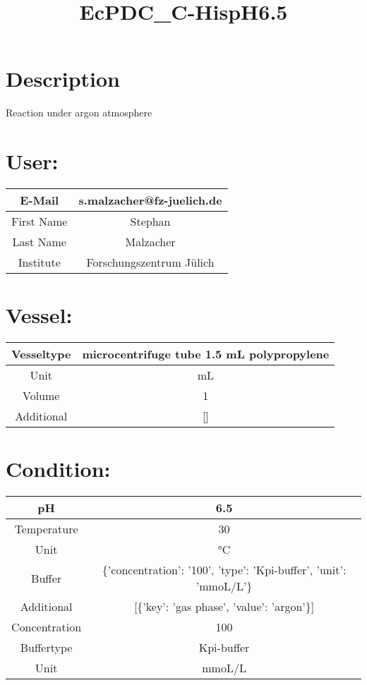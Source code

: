 \documentclass{article}%
\title{EcPDC\_C{-}HispH6.5}%
\begin{document}
%
\normalsize%
\maketitle%
\section{Description}%
\label{sec:Description}%
Reaction under argon atmosphere

%
\section{User:}%
\label{sec:User}%
\begin{tabular}{|c|c|}%
\hline%
E{-}Mail&s.malzacher@fz{-}juelich.de\\%
\hline%
First Name&Stephan\\%
\hline%
Last Name&Malzacher\\%
\hline%
Institute&Forschungszentrum Jülich\\%
\hline%
\end{tabular}

%
\section{Vessel:}%
\label{sec:Vessel}%
\begin{tabular}{|c|c|}%
\hline%
Vesseltype&microcentrifuge tube 1.5 mL polypropylene\\%
\hline%
Unit&mL\\%
\hline%
Volume&1\\%
\hline%
Additional&{[}{]}\\%
\hline%
\end{tabular}

%
\section{Condition:}%
\label{sec:Condition}%
\begin{tabular}{|c|c|}%
\hline%
pH&6.5\\%
\hline%
Temperature&30\\%
\hline%
Unit&°C\\%
\hline%
Buffer&\{'concentration': '100', 'type': 'Kpi{-}buffer', 'unit': 'mmoL/L'\}\\%
\hline%
Additional&{[}\{'key': 'gas phase', 'value': 'argon'\}{]}\\%
\hline%
Concentration&100\\%
\hline%
Buffertype&Kpi{-}buffer\\%
\hline%
Unit&mmoL/L\\%
\hline%
\end{tabular}

%
\end{document}

